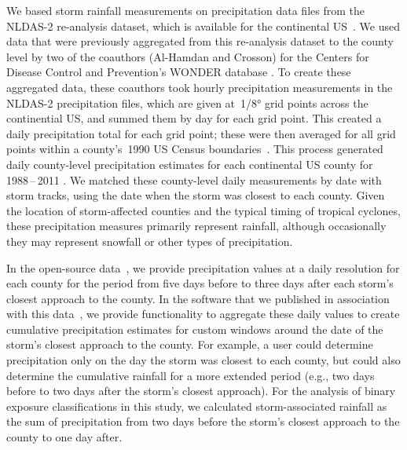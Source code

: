 We based storm rainfall measurements on precipitation data files from the
\ac{NLDAS-2} re-analysis dataset, which is available for the continental
\ac{US}~\parencite{rui2013nldas}. We used data that were previously aggregated
from this re-analysis dataset to the county level by two of the coauthors
(Al-Hamdan and Crosson) for the Centers for Disease Control and Prevention's
\ac{WONDER} database \parencite{cdcwonder, alhamdan2014environmental}. To
create these aggregated data, these coauthors took hourly precipitation
measurements in the \ac{NLDAS-2} precipitation files, which are given
at~1/8\si{\degree} grid points across the continential \ac{US}, and summed them
by day for each grid point.  This created a daily precipitation total for each
grid point; these were then averaged for all grid points within a county's~1990
\ac{US} Census boundaries~\parencite{alhamdan2014environmental, cdcwonder}.
This process generated daily county-level precipitation estimates for each
continental \ac{US} county for 1988\,--\,2011 \parencite{cdcwonder}.  We
matched these county-level daily measurements by date with storm tracks, using
the date when the storm was closest to each county. Given the location of
storm-affected counties and the typical timing of tropical cyclones, these
precipitation measures primarily represent rainfall, although occasionally they
may represent snowfall or other types of precipitation.  

In the open-source data~\parencite{hurricaneexposuredata}, we provide
precipitation values at a daily resolution for each county for the period from
five days before to three days after each storm's closest approach to the
county.  In the software that we published in association with this
data~\parencite{hurricaneexposure}, we provide functionality to aggregate these
daily values to create cumulative precipitation estimates for custom windows
around the date of the storm's closest approach to the county. For example, a
user could determine precipitation only on the day the storm was closest to
each county, but could also determine the cumulative rainfall for a more
extended period (e.g., two days before to two days after the storm's
closest approach). For the analysis of binary exposure classifications in this
study, we calculated storm-associated rainfall as the sum of precipitation from
two days before the storm's closest approach to the county to one day after.  

